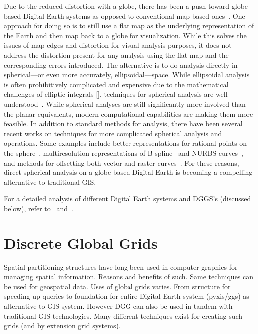Due to the reduced distortion with a globe, there has been a push toward globe based Digital Earth systems as opposed to conventional map based ones~\cite{goodchild2018reimagining}.
One approach for doing so is to still use a flat map as the underlying representation of the Earth and then map back to a globe for visualization.
While this solves the issues of map edges and distortion for visual analysis purposes, it does not address the distortion present for any analysis using the flat map and the corresponding errors introduced.
The alternative is to do analysis directly in spherical---or even more accurately, ellipsoidal---space.
While ellipsoidal analysis is often prohibitively complicated and expensive due to the mathematical challenges of elliptic integrals [], techniques for spherical analysis are well understood~\cite{raskin1994spatial}.
While spherical analyses are still significantly more involved than the planar equivalents, modern computational capabilities are making them more feasible. 
In addition to standard methods for analysis, there have been several recent works on techniques for more complicated spherical analysis and operations. Some examples include better representations for rational points on the sphere~\cite{bahrdt2017rational}, multiresolution representations of B-spline~\cite{alderson2016multiresolution} and NURBS curves~\cite{alderson2019multiscale}, and methods for offsetting both vector and raster curves~\cite{alderson2018offsetting}.
For these reasons, direct spherical analysis on a globe based Digital Earth is becoming a compelling alternative to traditional GIS.


For a detailed analysis of different Digital Earth systems and DGGS's (discussed below), refer to~\cite{mahdavi2015survey} and~\cite{alderson2020digital}.


\section{Discrete Global Grids}
Spatial partitioning structures have long been used in computer graphics for managing spatial information.
Reasons and benefits of such.
Same techniques can be used for geospatial data.
Uses of global grids varies.
From structure for speeding up queries to foundation for entire Digital Earth system (pyxis/ggs) as alternative to GIS system.
However DGG can also be used in tandem with traditional GIS technologies.
Many different techniques exist for creating such grids (and by extension grid systems).
\cite{sahr1998discrete}
\cite{sahr2003geodesic}


